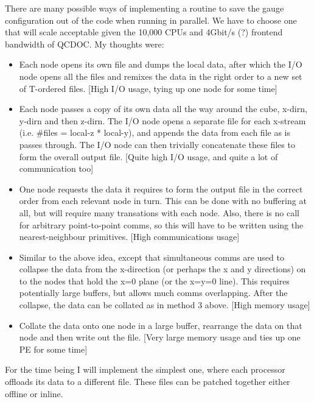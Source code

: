 \documentclass[12pt]{article}
\begin{document}
There are many possible ways of implementing a routine to save the gauge
configuration out of the code when running in parallel.  We have to choose
one that will scale acceptable given the 10,000 CPUs and 4Gbit/s (?) frontend
bandwidth of QCDOC.  My thoughts were:
\begin{itemize}

\item Each node opens its own file and dumps the local data, after which 
the I/O node opens all the files and remixes the data in the right 
order to a new set of T-ordered files.
[High I/O usage, tying up one node for some time]
    
\item Each node passes a copy of its own data all the way around the cube,
x-dirn, y-dirn and then z-dirn.  The I/O node opens a separate file for
each x-stream (i.e. \#files = local-z * local-y), and appends the data
from each file as is passes through.  The I/O node can then trivially
concatenate these files to form the overall output file.
[Quite high I/O usage, and quite a lot of communication too]

\item One node requests the data it requires to form the output file in 
the correct order from each relevant node in turn.  This can be done 
with no buffering at all, but will require many transations with each 
node. Also, there is no call for arbitrary point-to-point comms, so 
this will have to be written using the nearest-neighbour primitives.
[High communications usage]

\item Similar to the above idea, except that simultaneous comms are used 
to collapse the data from the x-direction (or perhaps the x and y
directions) on to the nodes that hold the x=0 plane (or the x=y=0
line).  This requires potentially large buffers, but allows much comms
overlapping.  After the collapse, the data can be collated as in method
3 above.  
[High memory usage]

\item Collate the data onto one node in a large buffer, rearrange the data
on that node and then write out the file.
[Very large memory usage and ties up one PE for some time]

\end{itemize}

For the time being I will implement the simplest one, where each processor
offloads its data to a different file.  These files can be patched together
either offline or inline.
\end{document}
